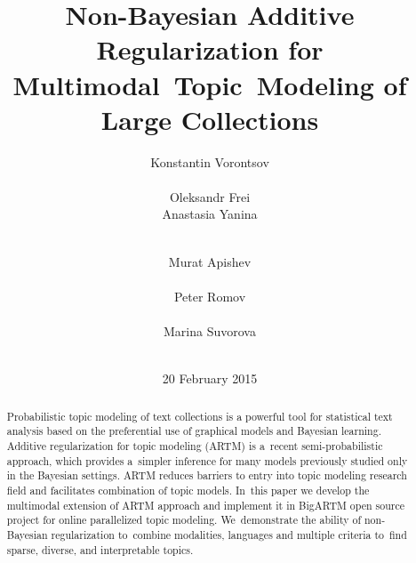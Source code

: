 \documentclass{acm_proc_article-sp}
\begin{document}
\title{
    Non-Bayesian Additive Regularization for Multimodal~Topic~Modeling of Large Collections
}
\author{
    \alignauthor
        Konstantin Vorontsov\\
        \\
    \alignauthor
        Oleksandr Frei\\
    \alignauthor
        Anastasia Yanina\\
        \\
    \and
    \alignauthor
        Murat Apishev\\
        \\
    \alignauthor
        Peter Romov\\
        \\
    \alignauthor
        Marina Suvorova\\
        \\
}
\date{20 February 2015}
\maketitle

\begin{abstract}
Probabilistic topic modeling of text collections is a powerful tool for statistical text analysis
based on the preferential use of graphical models and Bayesian learning.
Additive regularization for topic modeling (ARTM) is a~recent semi-probabilistic approach, which
provides a~simpler inference for many models previously studied only in the Bayesian settings.
ARTM reduces barriers to entry into topic modeling research field
and facilitates combination of topic models.
In~this paper we develop the multimodal extension of ARTM approach
and implement it in \mbox{BigARTM} open source project %
for online parallelized topic modeling.
We~demonstrate the ability of non-Bayesian regularization
to~combine modalities, languages and multiple criteria
to~find sparse, diverse, and interpretable topics.
\end{abstract}
\end{document}
